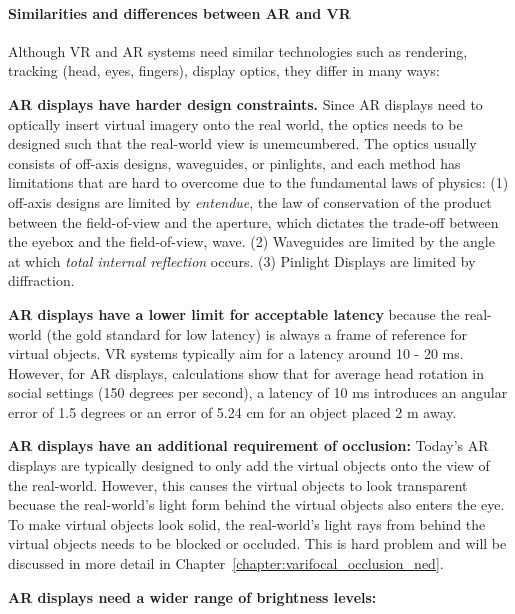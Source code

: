 \paragraph{Similarities and differences between AR and VR}
Although VR and AR systems need similar technologies such as rendering, tracking (head, eyes, fingers), display optics, they differ in many ways:

\begin{compact_enumerate}
\item \textbf{AR displays have harder design constraints.} Since AR displays need to optically insert virtual imagery onto the real world, the optics needs to be designed such that the real-world view is unemcumbered. 
The optics usually consists of off-axis designs, waveguides, or pinlights, and each method has limitations that are hard to overcome due to the fundamental laws of physics: 
(1) off-axis designs are limited by \emph{entendue}, the law of conservation of the product between the field-of-view and the aperture, which dictates the trade-off between the eyebox and the field-of-view, wave. 
(2) Waveguides are limited by the angle at which \emph{total internal reflection} occurs.
(3) Pinlight Displays are limited by diffraction.
\item \textbf{AR displays have a lower limit for acceptable latency} because the real-world (the gold standard for low latency) is always a frame of reference for virtual objects. 
VR systems typically aim for a latency around 10 - 20 ms. 
However, for AR displays, calculations show that for average head rotation in social settings (150 degrees per second), a latency of 10 ms introduces an angular error of 1.5 degrees or an error of 5.24 cm for an object placed 2 m away.
\item \textbf{AR displays have an additional requirement of occlusion:}
Today's AR displays are typically designed to only add the virtual objects onto the view of the real-world. 
However, this causes the virtual objects to look transparent becuase the real-world's light form behind the virtual objects also enters the eye. 
To make virtual objects look solid, the real-world's light rays from behind the virtual objects needs to be blocked or occluded. 
This is hard problem and will be discussed in more detail in Chapter~\ref{chapter:varifocal_occlusion_ned}.
\item \textbf{AR displays need a wider range of brightness levels:}

\end{compact_enumerate}
